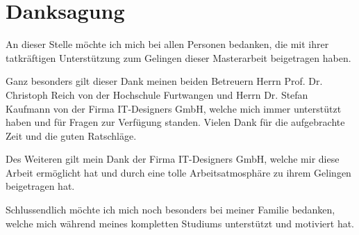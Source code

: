 
\chapter*{Danksagung} %

An dieser Stelle möchte ich mich bei allen Personen bedanken, die mit ihrer tatkräftigen Unterstützung zum
Gelingen dieser Masterarbeit beigetragen haben.

Ganz besonders gilt dieser Dank meinen beiden Betreuern Herrn Prof. Dr. Christoph Reich von
der Hochschule Furtwangen und Herrn Dr. Stefan Kaufmann von der Firma IT-Designers GmbH, welche
mich immer unterstützt haben und für Fragen zur Verfügung standen.
Vielen Dank für die aufgebrachte Zeit und die guten Ratschläge.

Des Weiteren gilt mein Dank der Firma IT-Designers GmbH, welche mir diese Arbeit ermöglicht hat und durch eine
tolle Arbeitsatmosphäre zu ihrem Gelingen beigetragen hat.

Schlussendlich möchte ich mich noch besonders bei meiner Familie bedanken, welche mich während meines
kompletten Studiums unterstützt und motiviert hat.